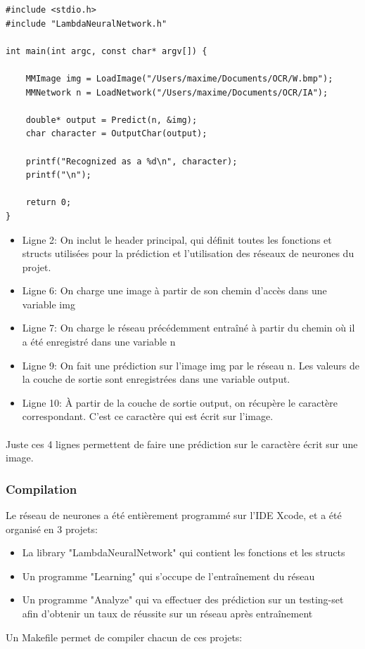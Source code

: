 \documentclass{article}
\begin{document}
\begin{lstlisting}
#include <stdio.h>
#include "LambdaNeuralNetwork.h"

int main(int argc, const char* argv[]) {

	MMImage img = LoadImage("/Users/maxime/Documents/OCR/W.bmp");
	MMNetwork n = LoadNetwork("/Users/maxime/Documents/OCR/IA");
	
	double* output = Predict(n, &img);
	char character = OutputChar(output);
	
	printf("Recognized as a %d\n", character);
	printf("\n");
	
	return 0;
}
\end{lstlisting}


\begin{itemize}
	\item Ligne 2: On inclut le header principal, qui définit toutes les fonctions et structs utilisées pour la prédiction et l'utilisation des réseaux de neurones du projet.
	\item Ligne 6: On charge une image à partir de son chemin d'accès dans une variable img
	\item Ligne 7: On charge le réseau précédemment entraîné à partir du chemin où il a été enregistré dans une variable n
	\item Ligne 9: On fait une prédiction sur l'image img par le réseau n. Les valeurs de la couche de sortie sont enregistrées dans une variable output.
	\item Ligne 10: À partir de la couche de sortie output, on récupère le caractère correspondant. C'est ce caractère qui est écrit sur l'image.
\end{itemize}

\paragraph{}Juste ces 4 lignes permettent de faire une prédiction sur le caractère écrit sur une image.

\newpage

\subsubsection{Compilation}
Le réseau de neurones a été entièrement programmé sur l'IDE Xcode, et a été organisé en 3 projets:


\begin{itemize}
	\item La library "LambdaNeuralNetwork" qui contient les fonctions et les structs
	\item Un programme "Learning" qui s'occupe de l'entraînement du réseau
	\item Un programme "Analyze" qui va effectuer des prédiction sur un testing-set afin d'obtenir un taux de réussite sur un réseau après entraînement
\end{itemize}
Un Makefile permet de compiler chacun de ces projets:
\end{document}

